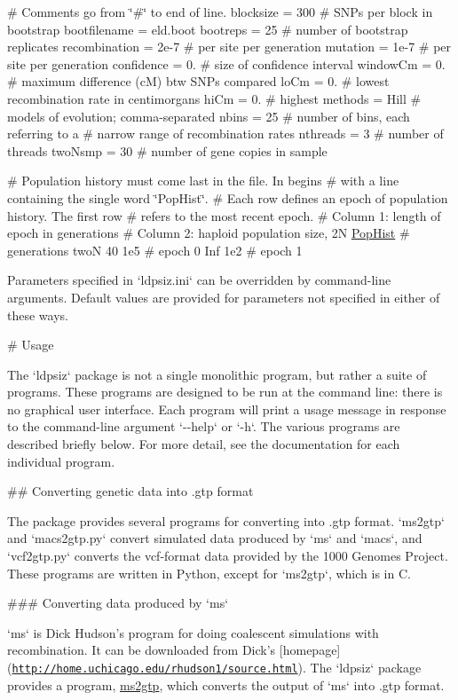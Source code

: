 \# \-Comments go from \char`\"{}\#\char`\"{} to end of line. blocksize = 300 \# \-S\-N\-Ps per block in bootstrap bootfilename = eld.\-boot bootreps = 25 \# number of bootstrap replicates recombination = 2e-\/7 \# per site per generation mutation = 1e-\/7 \# per site per generation confidence = 0. \# size of confidence interval window\-Cm = 0. \# maximum difference (c\-M) btw \-S\-N\-Ps compared lo\-Cm = 0. \# lowest recombination rate in centimorgans hi\-Cm = 0. \# highest methods = \-Hill \# models of evolution; comma-\/separated nbins = 25 \# number of bins, each referring to a \# narrow range of recombination rates nthreads = 3 \# number of threads two\-Nsmp = 30 \# number of gene copies in sample

\# \-Population history must come last in the file. \-In begins \# with a line containing the single word \char`\"{}\-Pop\-Hist\char`\"{}. \# \-Each row defines an epoch of population history. \-The first row \# refers to the most recent epoch. \# \-Column 1\-: length of epoch in generations \# \-Column 2\-: haploid population size, 2\-N \hyperlink{struct_pop_hist}{\-Pop\-Hist} \# generations two\-N 40 1e5 \# epoch 0 \-Inf 1e2 \# epoch 1

\-Parameters specified in `ldpsiz.ini` can be overridden by command-\/line arguments. \-Default values are provided for parameters not specified in either of these ways.

\# \-Usage

\-The `ldpsiz` package is not a single monolithic program, but rather a suite of programs. \-These programs are designed to be run at the command line\-: there is no graphical user interface. \-Each program will print a usage message in response to the command-\/line argument `-\/-\/help` or `-\/h`. \-The various programs are described briefly below. \-For more detail, see the documentation for each individual program.

\#\# \-Converting genetic data into .gtp format

\-The package provides several programs for converting into .gtp format. `ms2gtp` and `macs2gtp.py` convert simulated data produced by `ms` and `macs`, and `vcf2gtp.py` converts the vcf-\/format data provided by the 1000 \-Genomes \-Project. \-These programs are written in \-Python, except for `ms2gtp`, which is in \-C.

\#\#\# \-Converting data produced by `ms`

`ms` is \-Dick \-Hudson's program for doing coalescent simulations with recombination. \-It can be downloaded from \-Dick's \mbox{[}homepage\mbox{]}(\href{http://home.uchicago.edu/rhudson1/source.html}{\tt http\-://home.\-uchicago.\-edu/rhudson1/source.\-html}). \-The `ldpsiz` package provides a program, \hyperlink{ms2gtp}{ms2gtp}, which converts the output of `ms` into .gtp format.

